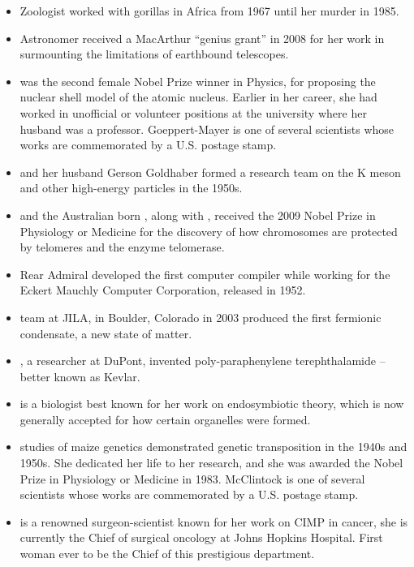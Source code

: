 \documentclass[12pt,a4paper]{article}
\begin{document}
\begin{enumerate}
\begin{itemize}
\begin{itemize}
        \item Zoologist  worked with gorillas in Africa from 1967 until her murder in 1985.
        \item Astronomer  received a MacArthur ``genius grant'' in 2008 for her work in surmounting the limitations of earthbound telescopes.
        \item {} was the second female Nobel Prize winner in Physics, for proposing the nuclear shell model of the atomic nucleus. Earlier in her career, she had worked in unofficial or volunteer positions at the university where her husband was a professor. Goeppert-Mayer is one of several scientists whose works are commemorated by a U.S. postage stamp.
        \item {} and her husband Gerson Goldhaber formed a research team on the K meson and other high-energy particles in the 1950s.
        \item {} and the Australian born , along with , received the 2009 Nobel Prize in Physiology or Medicine for the discovery of how chromosomes are protected by telomeres and the enzyme telomerase.
        \item Rear Admiral  developed the first computer compiler while working for the Eckert Mauchly Computer Corporation, released in 1952.
        \item {} team at JILA, in Boulder, Colorado in 2003 produced the first fermionic condensate, a new state of matter.
        \item {}, a researcher at DuPont, invented poly-paraphenylene terephthalamide – better known as Kevlar.
        \item {} is a biologist best known for her work on endosymbiotic theory, which is now generally accepted for how certain organelles were formed.
        \item {} studies of maize genetics demonstrated genetic transposition in the 1940s and 1950s. She dedicated her life to her research, and she was awarded the Nobel Prize in Physiology or Medicine in 1983. McClintock is one of several scientists whose works are commemorated by a U.S. postage stamp.
        \item {} is a renowned surgeon-scientist known for her work on CIMP in cancer, she is currently the Chief of surgical oncology at Johns Hopkins Hospital. First woman ever to be the Chief of this prestigious department.

\end{itemize}
\end{itemize}
\end{enumerate}
\end{document}
